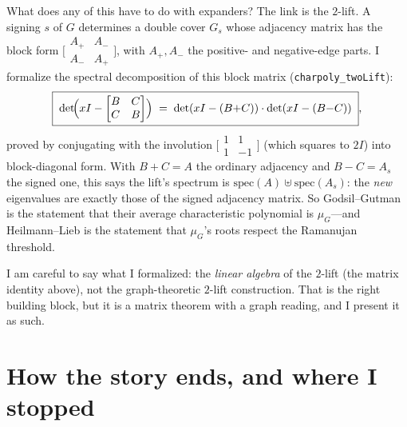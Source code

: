 \documentclass[11pt]{article}
\newcommand{\lean}[1]{\texttt{#1}}
\begin{document}
What does any of this have to do with expanders? The link is the $2$-lift.
A signing $s$ of $G$ determines a double cover $G_s$ whose adjacency matrix has
the block form $\bigl[\begin{smallmatrix}A_+&A_-\\A_-&A_+\end{smallmatrix}\bigr]$,
with $A_+,A_-$ the positive- and negative-edge parts. I formalize the
spectral decomposition of this block matrix (\lean{charpoly\_twoLift}):
\[
  \boxed{\;\det\!\Bigl(xI-\begin{bmatrix}B&C\\ C&B\end{bmatrix}\Bigr)
  \;=\;\det(xI-(B{+}C))\cdot\det(xI-(B{-}C))\;},
\]
proved by conjugating with the involution
$\bigl[\begin{smallmatrix}1&1\\1&-1\end{smallmatrix}\bigr]$ (which squares to
$2I$) into block-diagonal form. With $B{+}C=A$ the ordinary adjacency and
$B{-}C=A_s$ the signed one, this says the lift's spectrum is
$\mathrm{spec}(A)\uplus\mathrm{spec}(A_s)$: the \emph{new} eigenvalues are
exactly those of the signed adjacency matrix. So Godsil--Gutman is the
statement that their average characteristic polynomial is $\mu_G$---and
Heilmann--Lieb is the statement that $\mu_G$'s roots respect the Ramanujan
threshold.

I am careful to say what I formalized: the \emph{linear algebra} of the
$2$-lift (the matrix identity above), not the graph-theoretic $2$-lift
construction. That is the right building block, but it is a matrix theorem with
a graph reading, and I present it as such.

\section{How the story ends, and where I stopped}
\label{sec:future}
\end{document}
